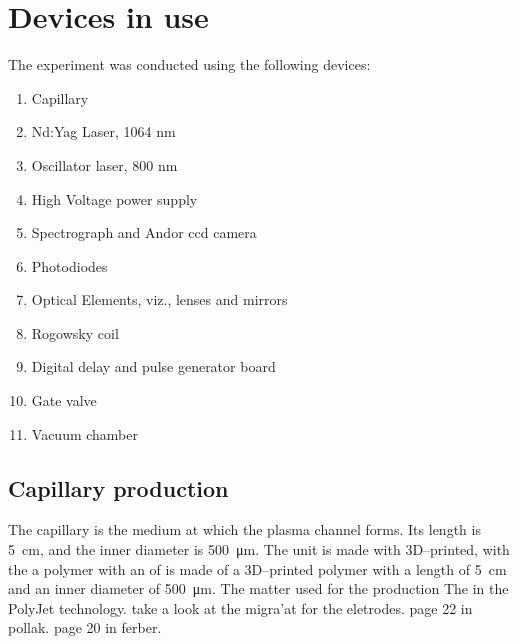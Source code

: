\documentclass[justified,nofonts,nobib]{tufte-book}
\begin{document}
	\section{Devices in use}\label{sec:devices}
The experiment was conducted using the following devices:
\begin{enumerate}
    \item Capillary
    \item Nd:Yag Laser, 1064 nm
    \item Oscillator laser, 800 nm
    \item High Voltage power supply
    \item Spectrograph and Andor ccd camera
    \item Photodiodes
    \item Optical Elements, viz., lenses and mirrors
    \item Rogowsky coil
    \item Digital delay and pulse generator board
    \item Gate valve
    \item Vacuum chamber
\end{enumerate}
\subsection{Capillary production}
The capillary is the medium at which the plasma channel forms. Its length is \SI{5}{\cm}, and the inner diameter is \SI{500}{\um}. The unit is made with   3D--printed, with the a polymer with an of is made of a 3D--printed polymer with a length of \SI{5}{\cm} and an inner diameter of \SI{500}{\um}. The matter used for the production The in the PolyJet technology. take a look at the migra'at for the eletrodes. page 22 in pollak. page 20 in ferber.
\end{document}
